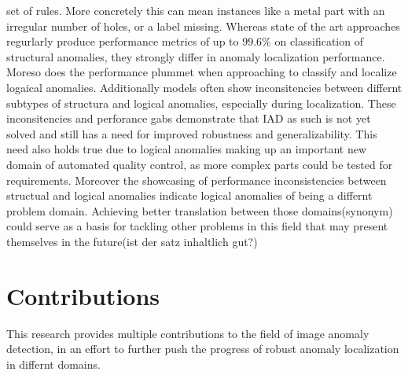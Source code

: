 set of rules. More concretely this can mean instances like a metal part with an irregular number of holes, or a label missing. Whereas 
state of the art approaches regurlarly produce performance metrics of up to $99.6 \% $ on classification of structural anomalies, they 
strongly differ in anomaly localization performance. Moreso does the performance plummet when approaching to classify and localize logaical 
anomalies. Additionally models often show inconsitencies between differnt subtypes of structura and logical anomalies, especially during 
localization. These inconsitencies and perforance gabs demonstrate that IAD as such is not yet solved and still has a need for improved 
robustness and generalizability. This need also holds true due to logical anomalies making up an important new domain of automated 
quality control, as more complex parts could be tested for requirements. Moreover the showcasing of performance inconsistencies between 
structual and logical anomalies indicate logical anomalies of being a differnt problem domain. Achieving better translation between those 
domains(synonym) could serve as a basis for tackling other problems in this field that may present themselves in the future(ist der satz 
inhaltlich gut?)




\section{Contributions}
This research provides multiple contributions to the field of image anomaly detection, in an effort to further push the progress of 
robust anomaly localization in differnt domains. 

